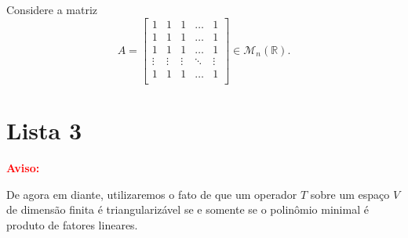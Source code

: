 \documentclass[11pt,a4paper]{article}
\begin{document}
 Considere a matriz 
\[
A = \begin{bmatrix}
1 & 1 & 1 & \ldots & 1 \\
1 & 1 & 1 & \ldots & 1 \\
1 & 1 & 1 & \ldots & 1 \\
\vdots & \vdots & \vdots & \ddots & \vdots \\
1 & 1 & 1 & \ldots & 1 \\
\end{bmatrix} \in \mathcal{M}_n(\mathbb{R}).
\]

\solucao{}
\newpage
\section{\textcolor{Floresta}{Lista 3}}

\noindent
\textbf{\textcolor{Red}{Aviso:}}

\medskip
\noindent
De agora em diante, utilizaremos o fato de que um operador $T$ sobre um espaço $V$ de dimensão finita é triangularizável se e somente se o polinômio minimal é produto de fatores lineares.
\end{document}
